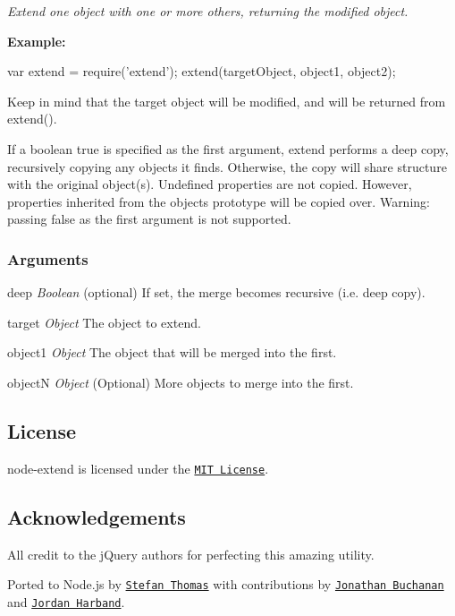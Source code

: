{\itshape Extend one object with one or more others, returning the modified object.}

{\bfseries Example\+:}


\begin{DoxyCode}
var extend = require('extend');
extend(targetObject, object1, object2);
\end{DoxyCode}


Keep in mind that the target object will be modified, and will be returned from extend().

If a boolean true is specified as the first argument, extend performs a deep copy, recursively copying any objects it finds. Otherwise, the copy will share structure with the original object(s). Undefined properties are not copied. However, properties inherited from the object\textquotesingle{}s prototype will be copied over. Warning\+: passing {\ttfamily false} as the first argument is not supported.

\subsubsection*{Arguments}


\begin{DoxyItemize}
\item {\ttfamily deep} {\itshape Boolean} (optional) If set, the merge becomes recursive (i.\+e. deep copy).
\item {\ttfamily target} {\itshape Object} The object to extend.
\item {\ttfamily object1} {\itshape Object} The object that will be merged into the first.
\item {\ttfamily objectN} {\itshape Object} (Optional) More objects to merge into the first.
\end{DoxyItemize}

\subsection*{License}

{\ttfamily node-\/extend} is licensed under the \href{http://opensource.org/licenses/MIT}{\tt M\+IT License}.

\subsection*{Acknowledgements}

All credit to the j\+Query authors for perfecting this amazing utility.

Ported to Node.\+js by \href{https://github.com/justmoon}{\tt Stefan Thomas} with contributions by \href{https://github.com/insin}{\tt Jonathan Buchanan} and \href{https://github.com/ljharb}{\tt Jordan Harband}. 